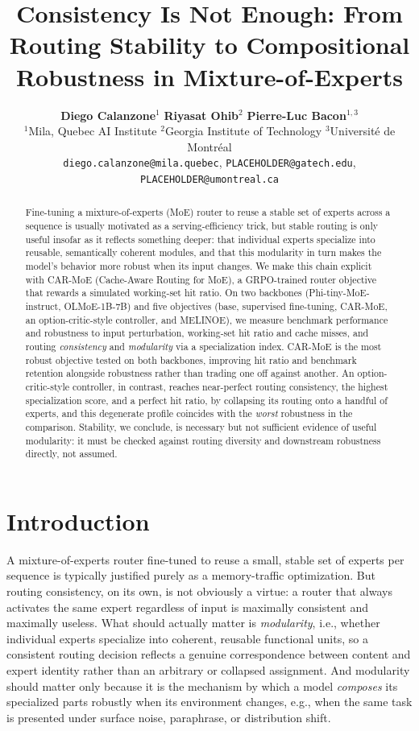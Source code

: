 \documentclass{article}
\title{Consistency Is Not Enough: From Routing Stability to Compositional Robustness in Mixture-of-Experts}
\author{
  \textbf{Diego Calanzone}$^{1}$ \quad \textbf{Riyasat Ohib}$^{2}$ \quad \textbf{Pierre-Luc Bacon}$^{1,3}$ \\[0.3em]
  \small $^{1}$Mila, Quebec AI Institute \quad
  $^{2}$Georgia Institute of Technology \quad
  $^{3}$Universit\'e de Montr\'eal \\
  \small \texttt{diego.calanzone@mila.quebec}, \texttt{PLACEHOLDER@gatech.edu}, \texttt{PLACEHOLDER@umontreal.ca}
}
\begin{document}
\maketitle

\begin{abstract}
Fine-tuning a mixture-of-experts (MoE) router to reuse a stable set of experts across a
sequence is usually motivated as a serving-efficiency trick, but stable routing is only
useful insofar as it reflects something deeper: that individual experts specialize into
reusable, semantically coherent modules, and that this modularity in turn makes the
model's behavior more robust when its input changes. We make this chain explicit with
CAR-MoE (Cache-Aware Routing for MoE), a GRPO-trained router objective that rewards a
simulated working-set hit ratio. On two backbones (Phi-tiny-MoE-instruct, OLMoE-1B-7B)
and five objectives (base, supervised fine-tuning, CAR-MoE, an option-critic-style
controller, and MELINOE), we measure benchmark performance and robustness to input
perturbation, working-set hit ratio and cache misses, and routing \emph{consistency} and
\emph{modularity} via a specialization index. CAR-MoE is the most robust objective tested
on both backbones, improving hit ratio and benchmark retention alongside robustness
rather than trading one off against another. An option-critic-style controller, in
contrast, reaches near-perfect routing consistency, the highest specialization score, and
a perfect hit ratio, by collapsing its routing onto a handful of experts, and this
degenerate profile coincides with the \emph{worst} robustness in the comparison.
Stability, we conclude, is necessary but not sufficient evidence of useful modularity: it
must be checked against routing diversity and downstream robustness directly, not
assumed.
\end{abstract}

\section{Introduction}

A mixture-of-experts router fine-tuned to reuse a small, stable set of experts per
sequence is typically justified purely as a memory-traffic optimization. But routing
consistency, on its own, is not obviously a virtue: a router that always activates the
same expert regardless of input is maximally consistent and maximally useless. What
should actually matter is \emph{modularity}, i.e., whether individual experts specialize
into coherent, reusable functional units, so a consistent routing decision reflects a
genuine correspondence between content and expert identity rather than an arbitrary or
collapsed assignment. And modularity should matter only because it is the mechanism by
which a model \emph{composes} its specialized parts robustly when its environment
changes, e.g., when the same task is presented under surface noise, paraphrase, or
distribution shift.
\end{document}
